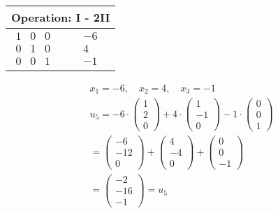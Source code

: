 \begin{longtable}{p{4cm}|p{3cm}}
    \multicolumn{2}{p{\dimexpr4cm+3cm+2\tabcolsep\relax}}{Operation: I - 2II}                 \\\hline\pagebreak[0]

    $\displaystyle\begin{matrix}
                          1 & 0 & 0 \\
                          0 & 1 & 0 \\
                          0 & 0 & 1
                      \end{matrix}$                    &
    $\displaystyle\begin{matrix}
                          -6 \\ 4 \\ -1
                      \end{matrix}$                                                               \\\hline
\end{longtable}

\begin{align*}
    x_1 = -6, \quad x_2 = 4, \quad x_3 = -1                                       \\
    u_5 = -6 \cdot \begin{pmatrix}
                       1 \\ 2 \\ 0
                   \end{pmatrix} + 4 \cdot \begin{pmatrix}
                                               1 \\ -1 \\ 0
                                           \end{pmatrix} - 1 \cdot \begin{pmatrix}
                                                                       0 \\ 0 \\ 1
                                                                   \end{pmatrix} \\
    = \begin{pmatrix}
          -6 \\ -12 \\ 0
      \end{pmatrix} + \begin{pmatrix}
                          4 \\-4 \\ 0
                      \end{pmatrix} + \begin{pmatrix}
                                          0 \\ 0 \\ -1
                                      \end{pmatrix}                              \\
    = \begin{pmatrix}
          -2 \\ -16 \\ -1
      \end{pmatrix} = u_5
\end{align*}

